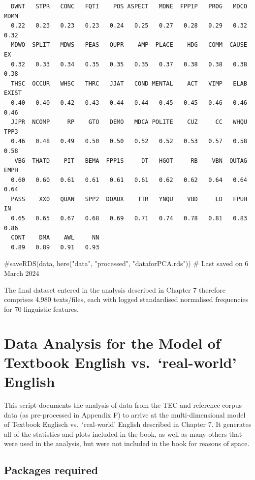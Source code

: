 \documentclass[
  letterpaper,
  DIV=11,
  numbers=noendperiod]{scrreprt}
\newenvironment{Shaded}{\begin{snugshade}}{\end{snugshade}}
\newcommand{\CommentTok}[1]{\textcolor[rgb]{0.37,0.37,0.37}{#1}}
\begin{document}
\begin{verbatim}
  DWNT   STPR   CONC   FQTI    POS ASPECT   MDNE  FPP1P   PROG   MDCO   MDMM 
  0.22   0.23   0.23   0.23   0.24   0.25   0.27   0.28   0.29   0.32   0.32 
  MDWO  SPLIT   MDWS   PEAS   QUPR    AMP  PLACE    HDG   COMM  CAUSE     EX 
  0.32   0.33   0.34   0.35   0.35   0.35   0.37   0.38   0.38   0.38   0.38 
  THSC  OCCUR   WHSC   THRC   JJAT   COND MENTAL    ACT   VIMP   ELAB  EXIST 
  0.40   0.40   0.42   0.43   0.44   0.44   0.45   0.45   0.46   0.46   0.46 
  JJPR  NCOMP     RP    GTO   DEMO   MDCA POLITE    CUZ     CC   WHQU   TPP3 
  0.46   0.48   0.49   0.50   0.50   0.52   0.52   0.53   0.57   0.58   0.58 
   VBG  THATD    PIT   BEMA  FPP1S     DT   HGOT     RB    VBN  QUTAG   EMPH 
  0.60   0.60   0.61   0.61   0.61   0.61   0.62   0.62   0.64   0.64   0.64 
  PASS    XX0   QUAN   SPP2  DOAUX    TTR   YNQU    VBD     LD   FPUH     IN 
  0.65   0.65   0.67   0.68   0.69   0.71   0.74   0.78   0.81   0.83   0.86 
  CONT    DMA    AWL     NN 
  0.89   0.89   0.91   0.93 
\end{verbatim}

\begin{Shaded}
\begin{Highlighting}[]
\CommentTok{\#saveRDS(data, here("data", "processed", "dataforPCA.rds")) \# Last saved on 6 March 2024}
\end{Highlighting}
\end{Shaded}

The final dataset entered in the analysis described in Chapter 7
therefore comprises 4,980 texts/files, each with logged standardised
normalised frequencies for 70 linguistic features.

\chapter{Data Analysis for the Model of Textbook English
vs.~`real-world'
English}\label{data-analysis-for-the-model-of-textbook-english-vs.-real-world-english}

This script documents the analysis of data from the TEC and reference
corpus data (as pre-processed in Appendix F) to arrive at the
multi-dimensional model of Textbook Englisch vs.~`real-world' English
described in Chapter 7. It generates all of the statistics and plots
included in the book, as well as many others that were used in the
analysis, but were not included in the book for reasons of space.

\section{Packages required}\label{packages-required-3}
\end{document}
